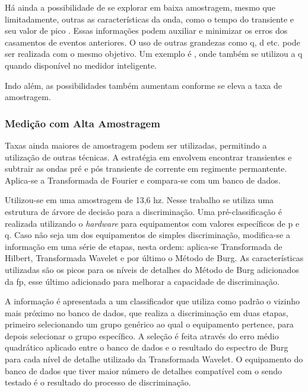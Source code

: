 Há ainda a possibilidade de se explorar em baixa amostragem, mesmo que 
limitadamente, outras as características da onda, como o tempo do transiente
e seu valor de pico \cite{nilm_cole_extra_info_surge_1998_15}. Essas informações podem
auxiliar e minimizar os erros dos casamentos de eventos anteriores. O uso de
outras grandezas como \gls{q}, \gls{d} etc. pode ser realizada com o mesmo
objetivo. Um exemplo é \cite{nilm_bergman_distribuido_2011}, onde também se utilizou a 
\gls{q} quando disponível no medidor inteligente.

Indo além, as possibilidades também aumentam conforme se eleva a taxa
de amostragem. 

\subsubsection{Medição com Alta Amostragem}
\label{sssec:nilm_alta_am}

Taxas ainda maiores de amostragem podem ser utilizadas, permitindo a utilização
de outras técnicas. A estratégia em
\cite{nilm_laughman_continuous_variables_2003_9} envolvem encontrar
transientes e subtrair as ondas pré e pós transiente de corrente em
regimente permantente. Aplica-se a Transformada de Fourier e
compara-se com um banco de dados. 

Utilizou-se em \cite{nilm_coppe_nascimento} uma amostragem de 13,6
\acrshort{hz}. Nesse trabalho se utiliza uma estrutura de árvore de
decisão para a discriminação. Uma pré-classificação é realizada
utilizando o \emph{hardware} para equipamentos com valores específicos
de \gls{p} e \gls{q}. Caso não seja um dos equipamentos de simples
discriminação, modifica-se a informação em uma série de etapas, nesta
ordem: aplica-se Transformada de Hilbert, Transformada Wavelet e por
último o Método de Burg. As características utilizadas são os picos 
para os níveis de detalhes do Método de Burg adicionados da \gls{fp},
esse último adicionado para melhorar a capacidade de discriminação.

A informação é apresentada a um
classificador que utiliza como padrão o vizinho mais próximo no banco
de dados, que realiza a discriminação em duas etapas, primeiro
selecionando um grupo genérico ao qual o equipamento pertence, para
depois selecionar o grupo específico. A seleção é feita através do
erro médio quadrático aplicado entre o banco de dados e o resultado do
espectro de Burg para cada nível de detalhe utilizado da Transformada
Wavelet. O equipamento do banco de dados que tiver maior número de
detalhes compatível com o sendo testado é o resultado do processo de
discriminação.

